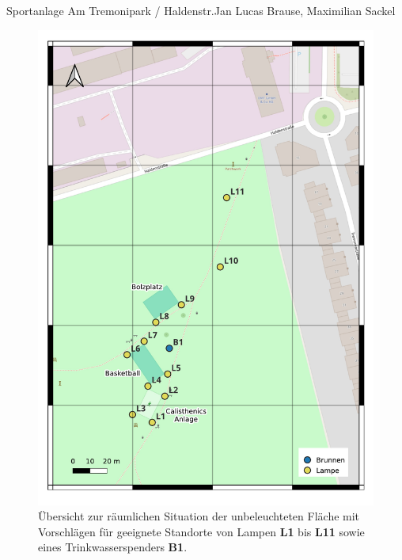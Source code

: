 \documentclass{../../templates/amendment}
\begin{document}
\begin{boxed}{Sportanlage Am Tremonipark / Haldenstr.}{Jan Lucas Brause, Maximilian Sackel}
    \begin{figure}[htpb]
        \centering
        \includegraphics[width=0.8\linewidth]{pictures/map3.pdf}
        \caption{Übersicht zur räumlichen Situation der unbeleuchteten Fläche mit Vorschlägen für geeignete Standorte von Lampen \textbf{L1} bis \textbf{L11} sowie eines Trinkwasserspenders \textbf{B1}.}%
        \label{fig:}
    \end{figure}
\end{boxed}
\end{document}
